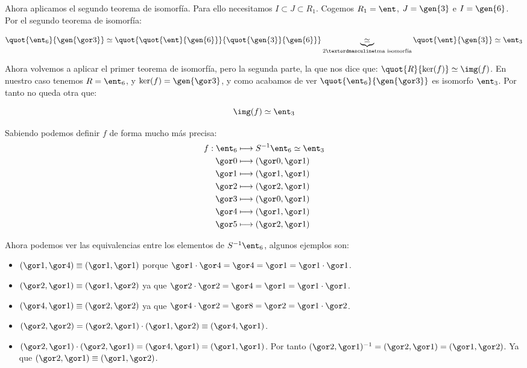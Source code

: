 \begin{example}
	Ahora aplicamos el segundo teorema de isomorfía. Para ello necesitamos $I \subset J \subset R_1$. Cogemos $R_1 = \ent$, $J=\gen{3}$ e $I=\gen{6}$. Por el segundo teorema de isomorfía:

	$$ \quot{\ent_6}{\gen{\cls{3}}} \simeq \quot{\quot{\ent}{\gen{6}}}{\quot{\gen{3}}{\gen{6}}} \underbrace{\simeq}_{2º \text{tma isomorfía} } \quot{\ent}{\gen{3}} \simeq \ent_3$$

	Ahora volvemos a aplicar el primer teorema de isomorfía, pero la segunda parte, la que nos dice que: $\quot{R}{\ker(f)} \simeq \img(f)$. En nuestro caso tenemos $R=\ent_6$, y $\ker(f)=\gen{\cls{3}}$, y como acabamos de ver  $\quot{\ent_6}{\gen{\cls{3}}}$ es isomorfo $\ent_3$. Por tanto no queda otra que:

	$$\img(f) \simeq \ent_3$$

	Sabiendo podemos definir $f$ de forma mucho más precisa:
	\begin{align*}
		f: \ent_6 & \longmapsto  S^{-1}\ent_6 \simeq \ent_3\\
		\cls{0} & \longmapsto (\cls{0},\cls{1}) \\
		\cls{1} & \longmapsto (\cls{1},\cls{1}) \\
		\cls{2} & \longmapsto (\cls{2},\cls{1}) \\
		\cls{3} & \longmapsto (\cls{0},\cls{1}) \\
		\cls{4} & \longmapsto (\cls{1},\cls{1}) \\
		\cls{5} & \longmapsto (\cls{2},\cls{1}) \\
	\end{align*}

	Ahora podemos ver las equivalencias entre los elementos de $S^{-1}\ent_6$, algunos ejemplos son:
	\begin{itemize}
		\item $(\cls{1},\cls{4})\equiv (\cls{1},\cls{1})$ porque $\cls{1}\cdot \cls{4} = \cls{4} = \cls{1} =\cls{1}\cdot \cls{1}$.
		\item $(\cls{2},\cls{1}) \equiv (\cls{1},\cls{2})$ ya que $\cls{2}\cdot \cls{2} = \cls{4} = \cls{1} =\cls{1}\cdot \cls{1}$.
		\item $(\cls{4},\cls{1}) \equiv (\cls{2},\cls{2})$ ya que $\cls{4}\cdot \cls{2} = \cls{8} = \cls{2} =\cls{1}\cdot \cls{2}$.
		\item $(\cls{2}, \cls{2}) = (\cls{2},\cls{1}) \cdot (\cls{1},\cls{2}) \equiv (\cls{4},\cls{1}) $.
		\item $(\cls{2},\cls{1}) \cdot (\cls{2},\cls{1}) = (\cls{4},\cls{1}) = (\cls{1},\cls{1})$. Por tanto $(\cls{2},\cls{1})^{-1}=(\cls{2},\cls{1}) = (\cls{1},\cls{2})$. Ya que $(\cls{2},\cls{1}) \equiv (\cls{1},\cls{2})$.
	\end{itemize}
	\end{example}

